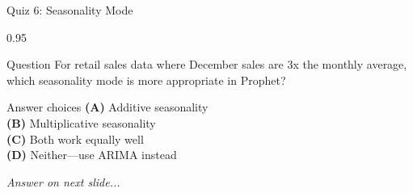 \documentclass[9pt, aspectratio=169, t]{beamer}
\begin{document}
\begin{frame}{Quiz 6: Seasonality Mode}
    \begin{cminipage}{0.95\textwidth}
    \begin{alertblock}{Question}
        For retail sales data where December sales are 3x the monthly average, which seasonality mode is more appropriate in Prophet?
    \end{alertblock}

    \vspace{0.4cm}

    \begin{block}{Answer choices}
        \textcolor{MainBlue}{\textbf{(A)}} Additive seasonality\\[3pt]
        \textcolor{MainBlue}{\textbf{(B)}} Multiplicative seasonality\\[3pt]
        \textcolor{MainBlue}{\textbf{(C)}} Both work equally well\\[3pt]
        \textcolor{MainBlue}{\textbf{(D)}} Neither---use ARIMA instead
    \end{block}

    \vspace{0.5cm}

    \begin{center}
        \textit{Answer on next slide...}
    \end{center}
    \end{cminipage}
\end{frame}
\end{document}
